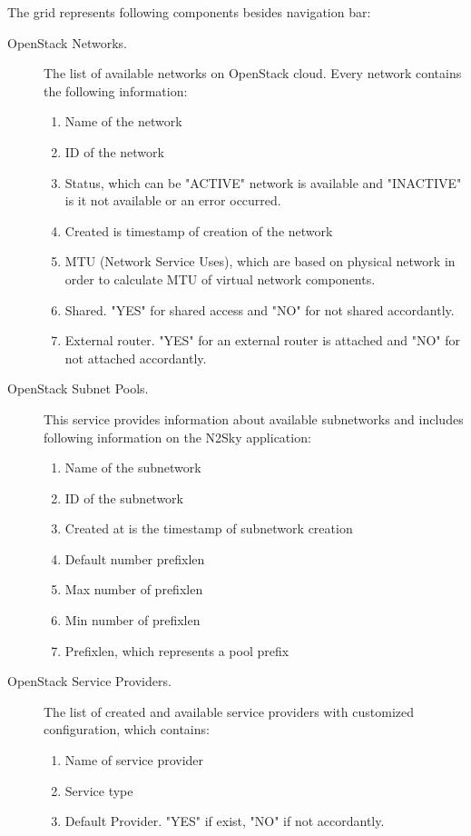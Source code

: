 The grid represents following components besides navigation bar: 
\begin{description}
\item[OpenStack Networks.]  The list of available networks on OpenStack cloud. Every network contains the following information:
\begin{enumerate}
\item Name of the network
\item ID of the network
\item Status, which can be "ACTIVE" network is available and "INACTIVE" is it not available or an error occurred. 
\item Created is timestamp of creation of the network
\item MTU (Network Service Uses), which are based on physical network in order to calculate MTU of virtual network components. 
\item Shared. "YES" for shared access and "NO" for not shared accordantly. 
\item External router. "YES" for an external router is attached and "NO" for not attached accordantly. 
\end{enumerate}
\item[OpenStack Subnet Pools.] This service provides information about available subnetworks and includes following information on the N2Sky application:
\begin{enumerate}
\item Name of the subnetwork
\item ID of the subnetwork
\item Created at is the timestamp of subnetwork creation
\item Default number prefixlen
\item Max number of prefixlen
\item Min number of prefixlen
\item Prefixlen, which represents a pool prefix
\end{enumerate}
\item[OpenStack Service Providers.] The list of created and available service providers with customized configuration, which contains:
\begin{enumerate}
\item Name of service provider
\item Service type
\item Default Provider. "YES" if exist, "NO" if not accordantly.  
\end{enumerate}

\end{description}


